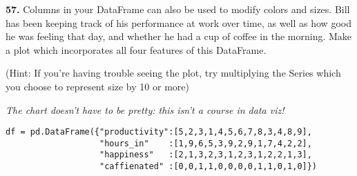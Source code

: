 \documentclass[11pt]{article}
\begin{document}
    \textbf{57.} Columns in your DataFrame can also be used to modify colors
and sizes. Bill has been keeping track of his performance at work over
time, as well as how good he was feeling that day, and whether he had a
cup of coffee in the morning. Make a plot which incorporates all four
features of this DataFrame.

(Hint: If you're having trouble seeing the plot, try multiplying the
Series which you choose to represent size by 10 or more)

\emph{The chart doesn't have to be pretty: this isn't a course in data
viz!}

\begin{verbatim}
df = pd.DataFrame({"productivity":[5,2,3,1,4,5,6,7,8,3,4,8,9],
                   "hours_in"    :[1,9,6,5,3,9,2,9,1,7,4,2,2],
                   "happiness"   :[2,1,3,2,3,1,2,3,1,2,2,1,3],
                   "caffienated" :[0,0,1,1,0,0,0,0,1,1,0,1,0]})
\end{verbatim}
\end{document}

